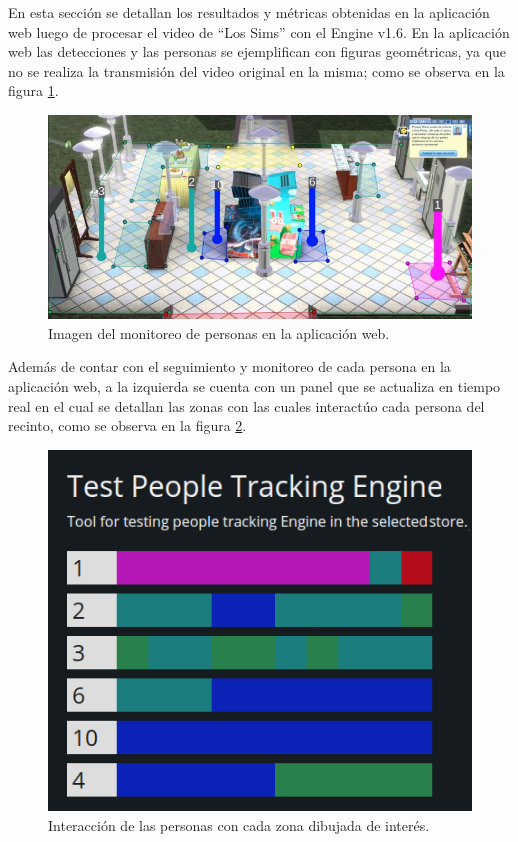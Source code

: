 En esta sección se detallan los resultados y métricas obtenidas en la aplicación web luego de procesar el video de ``Los Sims'' con el Engine v1.6. En la aplicación web las detecciones y las personas se ejemplifican con figuras geométricas, ya que no se realiza la transmisión del video original en la misma; como se observa en la figura \ref{fig:simsWebApp}.

\begin{figure}[ht]
	\centering
	\includegraphics[scale=.60]{./Figures/simsWebApp.jpg}
	\caption{Imagen del monitoreo de personas en la aplicación web.}
	\label{fig:simsWebApp}
\end{figure}

Además de contar con el seguimiento y monitoreo de cada persona en la aplicación web, a la izquierda se cuenta con un panel que se actualiza en tiempo real en el cual se detallan las zonas con las cuales interactúo cada persona del recinto, como se observa en la figura \ref{fig:simsWebApp2}.

\begin{figure}[ht]
	\centering
	\includegraphics[scale=.80]{./Figures/simsWebApp2.png}
	\caption{Interacción de las personas con cada zona dibujada de interés.}
	\label{fig:simsWebApp2}
\end{figure}

